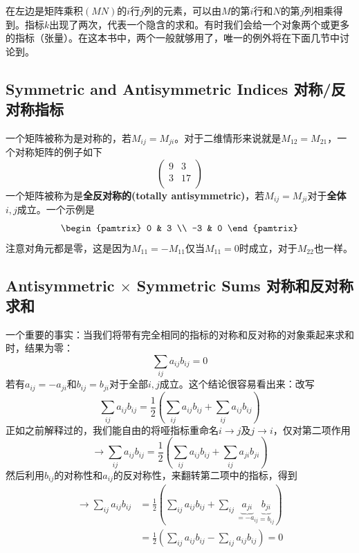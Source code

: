 在左边是矩阵乘积$(MN)$的$i$行$j$列的元素，可以由$M$的第$i$行和$N$的第$j$列相乘得到。指标$k$出现了两次，代表一个隐含的求和。有时我们会给一个对象两个或更多的指标（张量）。在这本书中，两个一般就够用了，唯一的例外将在下面几节中讨论到。

\subsection[对称/反对称指标]{Symmetric and Antisymmetric Indices 对称/反对称指标}\label{appendix.B.5.3}
一个矩阵被称为是对称的，若$M_{ij}=M_{ji}$。对于二维情形来说就是$M_{12}=M_{21}$，一个对称矩阵的例子如下
\begin{equation}
\begin{pmatrix}
9 & 3 \\ 3 & 17 \\
\end{pmatrix}
\end{equation}
一个矩阵被称为是{\bf 全反对称的(totally antisymmetric)}，若$M_{ij}=M_{ji}$对于{\bf 全体}$i,j$成立。一个示例是
\begin{equation}
\begin{pamtrix}
0 & 3 \\ -3 & 0
\end{pamtrix}
\end{equation}
注意对角元都是零，这是因为$M_{11}=-M_{11}$仅当$M_{11}=0$时成立，对于$M_{22}$也一样。
\subsection[对称和反对称求和]{Antisymmetric $\times$ Symmetric Sums 对称和反对称求和}\label{appendix.B.5.4}
一个重要的事实：当我们将带有完全相同的指标的对称和反对称的对象乘起来求和时，结果为零：
\begin{equation}
\sum\limits_{ij}a_{ij}b_{ij} = 0
\end{equation}
若有$a_{ij}=-a_{ji}$和$b_{ij}=b_{ji}$对于全部$i,j$成立。这个结论很容易看出来：改写
\begin{equation}
\sum\limits_{ij}a_{ij}b_{ij} = \frac{1}{2}\left(\sum\limits_{ij}a_{ij}b_{ij}+\sum\limits_{ij}a_{ij}b_{ij}\right)
\end{equation}
正如之前解释过的，我们能自由的将哑指标重命名$i\rightarrow j$及$j\rightarrow i$，仅对第二项作用
\begin{equation}
\rightarrow \sum\limits_{ij}a_{ij}b_{ij} = \frac{1}{2}\left(\sum\limits_{ij}a_{ij}b_{ij}+\sum\limits_{ij}a_{ji}b_{ji}\right)
\end{equation}
然后利用$b_{ij}$的对称性和$a_{ij}$的反对称性，来翻转第二项中的指标，得到%
\begin{equation}
\begin{aligned}
\rightarrow \sum\limits_{ij}a_{ij}b_{ij} &= \frac{1}{2}\left(\sum\limits_{ij}a_{ij}b_{ij}+\sum\limits_{ij}\underbrace{a_{ji}}_{=-a_{ij}}\underbrace{b_{ji}}_{=b_{ij}}\right)\\
 &= \frac{1}{2}\left(\sum\limits_{ij}a_{ij}b_{ij}-\sum\limits_{ij}a_{ij}b_{ij}\right) = 0
\end{aligned}
\end{equation}
